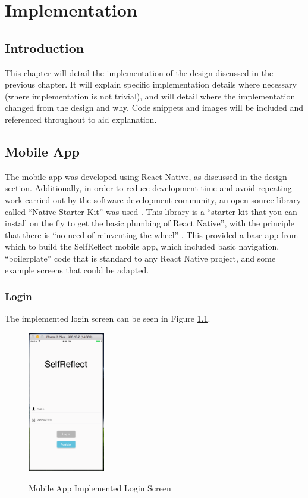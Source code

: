 \documentclass[11pt,openright,a4paper]{report}
\begin{document}
\chapter{Implementation}
\section{Introduction}
This chapter will detail the implementation of the design discussed in the previous chapter. It will explain specific implementation details where necessary (where implementation is not trivial), and will detail where the implementation changed from the design and why. Code snippets and images will be included and referenced throughout to aid explanation.

\section{Mobile App}
The mobile app was developed using React Native, as discussed in the design section. Additionally, in order to reduce development time and avoid repeating work carried out by the software development community, an open source library called \enquote{Native Starter Kit} was used \parencite{nativestarterkit}. This library is a \enquote{starter kit that you can install on the fly to get the basic plumbing of React Native}, with the principle that there is \enquote{no need of reinventing the wheel} \parencite{nativestarterkit}. This provided a base app from which to build the SelfReflect mobile app, which included basic navigation, \enquote{boilerplate} code that is standard to any React Native project, and some example screens that could be adapted.

\subsection{Login}
The implemented login screen can be seen in Figure \ref{fig:mobileloginimpl}.

\begin{figure}[ht]
\centering
\caption{Mobile App Implemented Login Screen}
\includegraphics[width=0.3\textwidth]{i/mobileloginimpl.png}
\label{fig:mobileloginimpl}
\end{figure}
\end{document}
